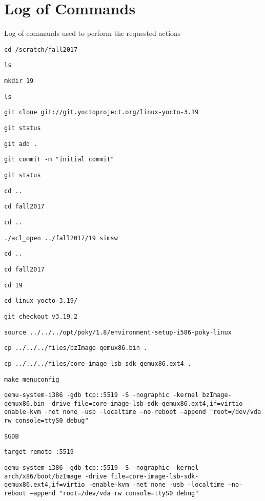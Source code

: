 \documentclass[10pt,letterpaper,draftclsnofoot,onecolumn]{IEEEtran}
\begin{document}
\section{Log of Commands}
\noindent Log of commands used to perform the requested actions
\begin{description}
\item \texttt{cd /scratch/fall2017}
\item \texttt{ls}
\item \texttt{mkdir 19}
\item \texttt{ls}
\item \texttt{git clone git://git.yoctoproject.org/linux-yocto-3.19}
\item \texttt{git status}
\item \texttt{git add .}
\item \texttt{git commit -m "initial commit"}
\item \texttt{git status}
\item \texttt{cd ..}
\item \texttt{cd fall2017}
\item \texttt{cd ..}
\item \texttt{./acl\_open ../fall2017/19 simsw}
\item \texttt{cd ..}
\item \texttt{cd fall2017}
\item \texttt{cd 19}
\item \texttt{cd linux-yocto-3.19/}
\item \texttt{git checkout v3.19.2}
\item \texttt{source ../../../opt/poky/1.8/environment-setup-i586-poky-linux }
\item \texttt{cp ../../../files/bzImage-qemux86.bin .}
\item \texttt{cp ../../../files/core-image-lsb-sdk-qemux86.ext4 .}
\item \texttt{make menuconfig}
\item \texttt{qemu-system-i386 -gdb tcp::5519 -S -nographic -kernel bzImage-qemux86.bin -drive file=core-image-lsb-sdk-qemux86.ext4,if=virtio -enable-kvm -net none -usb -localtime --no-reboot --append "root=/dev/vda rw console=ttyS0 debug"}
\item \texttt{\$GDB}
\item \texttt{target remote :5519}
\item \texttt{qemu-system-i386 -gdb tcp::5519 -S -nographic -kernel arch/x86/boot/bzImage -drive file=core-image-lsb-sdk-qemux86.ext4,if=virtio -enable-kvm -net none -usb -localtime --no-reboot --append "root=/dev/vda rw console=ttyS0 debug"}
\end{description}
\end{document}
